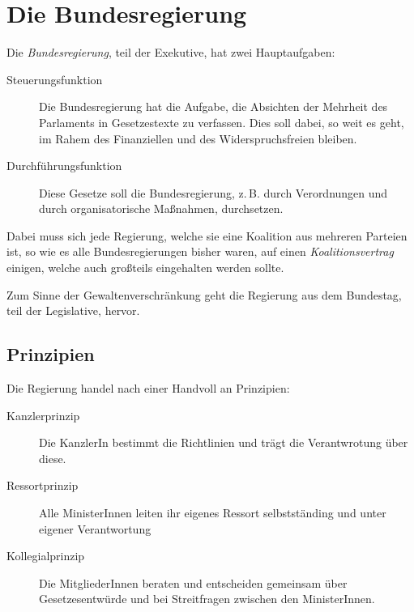 \documentclass{article}
\begin{document}
\section{Die Bundesregierung}
Die \emph{Bundesregierung}, teil der Exekutive, hat zwei Hauptaufgaben:
\begin{description}
 \item[Steuerungsfunktion] Die Bundesregierung hat die Aufgabe, die Absichten der Mehrheit des Parlaments in Gesetzestexte zu verfassen. Dies soll dabei, so weit es geht, im Rahem des Finanziellen und des Widerspruchsfreien bleiben.
 \item[Durchführungsfunktion] Diese Gesetze soll die Bundesregierung, z.\,B. durch Verordnungen und durch organisatorische Maßnahmen, durchsetzen. 
\end{description}
Dabei muss sich jede Regierung, welche sie eine Koalition aus mehreren Parteien ist, so wie es alle Bundesregierungen bisher waren, auf einen \emph{Koalitionsvertrag} einigen, welche auch großteils eingehalten werden sollte.
 
Zum Sinne der Gewaltenverschränkung geht die Regierung aus dem Bundestag, teil der Legislative, hervor.  
 
\subsection{Prinzipien}
Die Regierung handel nach einer Handvoll an Prinzipien:
\begin{description}
 \item[Kanzlerprinzip] Die KanzlerIn bestimmt die Richtlinien und trägt die Verantwrotung über diese.
 \item[Ressortprinzip] Alle MinisterInnen leiten ihr eigenes Ressort selbstständing und unter eigener Verantwortung
 \item[Kollegialprinzip] Die MitgliederInnen beraten und entscheiden gemeinsam über Gesetzesentwürde und bei Streitfragen zwischen den MinisterInnen. 
\end{description} 
\end{document}
